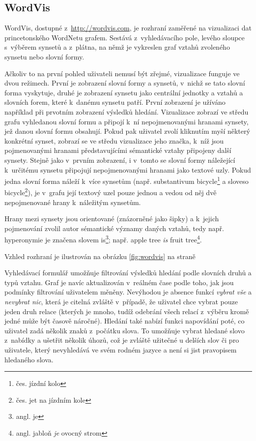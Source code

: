 \documentclass[a4paper,11pt,openany,twoside]{book}
\newcommand\ex{\textsf}
\begin{document}
				\subsection{WordVis}
				\label{vis:wordvis}

					WordVis, dostupné z~\url{http://wordvis.com}, je rozhraní zaměřené na vizualizaci dat princetonského WordNetu grafem. Sestává z~vyhledávacího pole, levého sloupce s~výběrem synsetů a z~plátna, na němž je vykreslen graf vztahů zvoleného synsetu nebo slovní formy. 

					Ačkoliv to na první pohled uživateli nemusí být zřejmé, vizualizace funguje ve dvou režimech. První je zobrazení slovní formy a synsetů, v~nichž se tato slovní forma vyskytuje, druhé je zobrazení synsetu jako centrální jednotky a vztahů a slovních forem, které k~danému synsetu patří. První zobrazení je užíváno například při prvotním zobrazení výsledků hledání. Vizualizace zobrazí ve středu grafu vyhledanou slovní formu a připojí k~ní nepojmenovanými hranami synsety, jež danou slovní formu obsahují. Pokud pak uživatel zvolí kliknutím myší některý konkrétní synset, zobrazí se ve středu vizualizace jeho značka, k~níž jsou pojmenovanými hranami představujícími sémantické vztahy připojeny další synsety. Stejně jako v~prvním zobrazení, i v~tomto se slovní formy náležející k~určitému synsetu připojují nepojmenovanými hranami jako textové uzly. Pokud jedna slovní forma náleží k~více synsetům (např. substantivum \ex{bicycle}\footnote{čes. \ex{jízdní kolo}} a sloveso \ex{bicycle}\footnote{čes. \ex{jet na jízdním kole}}), je v~grafu její textový uzel pouze jednou a vedou od něj dvě nepojmenované hrany k~náležitým synsetům. 

					Hrany mezi synsety jsou orientované (znázorněné jako šipky) a k~jejich pojmenování zvolil autor sémantické významy daných vztahů, tedy např. hyperonymie je značena slovem \ex{is}\footnote{angl. \ex{je}}; např. \ex{apple tree \textit{is} fruit tree}\footnote{angl. \ex{jabloň \textit{je} ovocný strom}}.

					Vzhled rozhraní je ilustrován na obrázku \ref{fig:wordvis} na straně \pageref{fig:wordvis}

					Vyhledávací formulář umožňuje filtrování výsledků hledání podle slovních druhů a typů vztahu. Graf je navíc aktualizován v~reálném čase podle toho, jak jsou podmínky filtrování uživatelem měněny. Nevýhodou je absence funkcí \textit{vybrat vše} a \textit{nevybrat nic}, která je citelná zvláště v~případě, že uživatel chce vybrat pouze jeden druh relace (kterých je mnoho, tudíž odebrání všech relací z~výběru kromě jedné může být časově náročné). Hledání také nabízí funkci napovídání poté, co uživatel zadá několik znaků z~počátku slova. To umožňuje vybrat hledané slovo z~nabídky a ušetřit několik úhozů, což je zvláště užitečné u delších slov či pro uživatele, který nevyhledává ve svém rodném jazyce a není si jist pravopisem hledaného slova.
\end{document}
